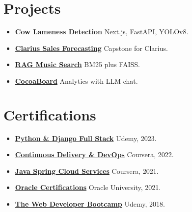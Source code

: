 \documentclass[11pt,letterpaper]{article}
\renewenvironment{projectItems}{%
  \begin{itemize}[
    leftmargin=11pt,
    label=\textbullet,
    itemsep=1.2pt,
    topsep=0.4pt,
    parsep=0pt,
    partopsep=0pt
  ]%
}{%
  \end{itemize}%
}
\begin{document}
\noindent
\begin{minipage}[t]{0.48\textwidth}
\section{Projects}
\begin{projectItems}
  \item \textbf{\href{http://134.87.8.85/}{Cow Lameness Detection}} Next.js, FastAPI, YOLOv8.
  \item \textbf{\href{https://clarius.com/}{Clarius Sales Forecasting}} Capstone for Clarius.
  \item \textbf{\href{https://github.com/UBC-MDS/DSCI_575_project_vvalson_ksn28}{RAG Music Search}} BM25 plus FAISS.
  \item \textbf{\href{https://github.com/UBC-MDS/DSCI-532_2026_8_cocoaboard}{CocoaBoard}} Analytics with LLM chat.
\end{projectItems}
\end{minipage}
\hfill
\begin{minipage}[t]{0.48\textwidth}
\section{Certifications}
\begin{projectItems}
  \item \textbf{\href{https://drive.google.com/file/d/1-ORKVAx0udZ0dV8Vc_lQebV5gjcrCkPH/view?usp=drive_link}{Python \& Django Full Stack}} Udemy, 2023.
  \item \textbf{\href{https://drive.google.com/file/d/1Iny_yK69sipAXIlXUl-OZhhfCKdR1l_e/view?usp=drive_link}{Continuous Delivery \& DevOps}} Coursera, 2022.
  \item \textbf{\href{https://drive.google.com/file/d/1p6AXXfRJtpG_pde_bYuxBSDmI6WgW8JJ/view?usp=drive_link}{Java Spring Cloud Services}} Coursera, 2021.
  \item \textbf{\href{https://drive.google.com/drive/folders/1-gyyUZcfAckczplJ9zbMVv2olWTfP0ge}{Oracle Certifications}} Oracle University, 2021.
  \item \textbf{\href{https://drive.google.com/file/d/1-t2aF_r2FAPTK-_279hwxgoxBMVLFqKR/view?usp=drive_link}{The Web Developer Bootcamp}} Udemy, 2018.
\end{projectItems}
\end{minipage}
\end{document}
